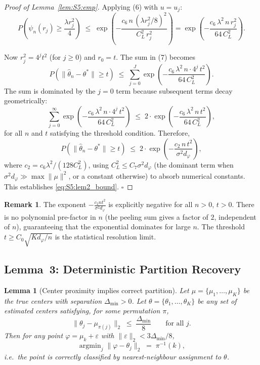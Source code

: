 \documentclass[twoside]{article}
\theoremstyle{plain}
\newtheorem{lemma}[theorem]{Lemma}
\theoremstyle{definition}
\newtheorem{remark}[theorem]{Remark}
\theoremstyle{remark}
\newcommand{\argmin}{\operatorname{argmin}}
\newcommand{\1}{\mathbf{1}}
\renewcommand{\phi}{\varphi}
\newcommand{\htheta}{\hat{\theta}}
\newcommand{\muk}{\mu_k}
\newcommand{\mutrue}{\{\mu_1,\dots,\mu_K\}}
\newcommand{\norm}[1]{\lVert#1\rVert}
\begin{document}
\begin{proof}[Proof of Lemma~\ref{lem:S5:emp}]
Applying (6) with $u=u_j$:
\begin{equation}
P\!\left(\psi_n(r_j)\ge\frac{\lambda r_j^2}{4}\right)
\;\le\; \exp\!\left(
          -\frac{c_6\,n\,(\lambda r_j^2/8)^2}{C_L^2\,r_j^2}\right)
= \exp\!\left(-\frac{c_6\,\lambda^2\,n\,r_j^2}{64\,C_L^2}\right).
\tag{8}
\end{equation}

Now $r_j^2=4^j t^2$ (for $j\ge0$) and $r_0=t$.  The sum in (7) becomes
\[
P(\norm{\htheta_n-\theta^*}\ge t)
\;\le\; \sum_{j=0}^J
       \exp\!\left(-\frac{c_6\,\lambda^2\,n\cdot4^j\,t^2}{64\,C_L^2}\right).
\]
The sum is dominated by the $j=0$ term because subsequent terms decay
geometrically:
\[
\sum_{j=0}^\infty \exp\!\left(-\frac{c_6\,\lambda^2\,n\cdot4^j\,t^2}
                                   {64\,C_L^2}\right)
\;\le\; 2\cdot\exp\!\left(-\frac{c_6\,\lambda^2\,n\,t^2}{64\,C_L^2}\right),
\]
for all $n$ and $t$ satisfying the threshold condition.  Therefore,
\[
P(\norm{\htheta_n-\theta^*}\ge t)
\;\le\; 2\cdot\exp\!\left(-\frac{c_2\,n\,t^2}{\sigma^2 d_\phi}\right),
\]
where $c_2=c_6\lambda^2/(128 C_L^2)$, using
$C_L^2\le C_7\sigma^2 d_\phi$ (the dominant term when
$\sigma^2 d_\phi\gg\max\norm{\mu}^2$, or a constant otherwise) to
absorb numerical constants.  This establishes \eqref{eq:S5:lem2_bound}.
\hfill$\square$
\end{proof}

\begin{remark}
The exponent $-\frac{c_2 n t^2}{\sigma^2 d_\phi}$ is explicitly negative
for all $n>0$, $t>0$.  There is no polynomial pre-factor in $n$ (the
peeling sum gives a factor of $2$, independent of $n$), guaranteeing
that the exponential dominates for large $n$.  The threshold
$t\ge C_0\sqrt{K d_\phi/n}$ is the statistical resolution limit.
\end{remark}

\subsection{Lemma~3: Deterministic Partition Recovery}
\label{sec:S5:lem3}

\begin{lemma}[Center proximity implies correct partition]
\label{lem:S5:part}
Let $\mu=\mutrue$ be the true centers with separation $\Delta_{\min}>0$.
Let $\theta=\{\theta_1,\dots,\theta_K\}$ be any set of estimated centers
satisfying, for some permutation $\pi$,
\[
\norm{\theta_j-\mu_{\pi(j)}}_2 \;\le\; \frac{\Delta_{\min}}{8}
\qquad \text{for all } j.
\]
Then for any point $\phi=\muk+\varepsilon$ with
$\norm{\varepsilon}_2<3\Delta_{\min}/8$,
\[
\argmin_{j}\norm{\phi-\theta_j}_2 \;=\; \pi^{-1}(k),
\]
i.e.\ the point is correctly classified by nearest-neighbour assignment to $\theta$.
\end{lemma}
\end{document}
